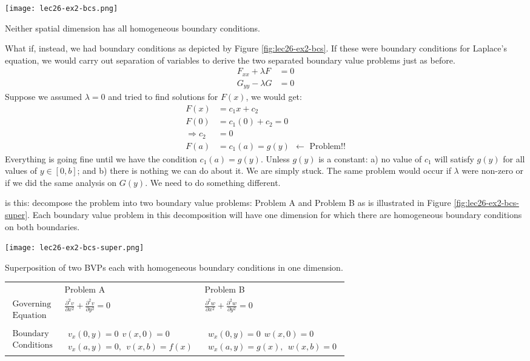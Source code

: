 \begin{marginfigure}
\texttt{[image: lec26-ex2-bcs.png]}
\caption{Neither spatial dimension has all homogeneous boundary conditions.}
\label{fig:lec26-ex2-bcs}
\end{marginfigure}
What if, instead, we had boundary conditions as depicted by Figure \ref{fig:lec26-ex2-bcs}.  If these were boundary conditions for Laplace's equation, we would carry out separation of variables to derive the two separated boundary value problems just as before.
\begin{align*}
F_{xx}+\lambda F &= 0 \\
G_{yy}-\lambda G &= 0
\end{align*}
Suppose we assumed $\lambda = 0$ and tried to find solutions for $F(x)$, we would get:
\begin{align*}
F(x) &= c_1 x + c_2 \\
F(0) &= c_1 (0) +  c_2 = 0 \\
\Rightarrow c_2 &= 0 \\
F(a) &= c_1(a) = g(y) \ \ \leftarrow \text{  Problem!!}
\end{align*}
Everything is going fine until we have the condition $c_1(a) = g(y)$.  Unless $g(y)$ is a constant: a) no value of $c_1$ will satisfy $g(y)$ for all values of $y \in [0,b]$; and b) there is nothing we can do about it.  We are simply stuck.  The same problem would occur if $\lambda$ were non-zero or if we did the same analysis on $G(y)$.  We need to do something different.


 is this: decompose the problem into two boundary value problems: Problem A and Problem B as is illustrated in Figure \ref{fig:lec26-ex2-bcs-super}.  Each boundary value problem in this decomposition will have one dimension for which there are homogeneous boundary conditions on both boundaries.
\begin{marginfigure}
\texttt{[image: lec26-ex2-bcs-super.png]}
\caption{Superposition of two BVPs each with homogeneous boundary conditions in one dimension.}
\label{fig:lec26-ex2-bcs-super}
\end{marginfigure}
\begin{table}
\begin{tabular}{l l | l}
 & Problem A & Problem B \\ 
 $\substack{\text{Governing} \\ \text{Equation}}$ & $\frac{\partial^2 v}{\partial x^2} + \frac{\partial^2 v}{\partial y^2}=0$ & $\frac{\partial^2 w}{\partial x^2} + \frac{\partial^2 w}{\partial y^2}=0$\\
 & & \\
 $\substack{\text{Boundary}\\\text{Conditions}}$ & $\substack{v_x(0,y) = 0 \ \ v(x,0) = 0\\ v_x(a,y) = 0, \ \ v(x,b)=f(x)}$ & $\substack{w_x(0,y) = 0 \ \ w(x,0) = 0 \\ w_x(a,y) = g(x), \ \ w(x,b) = 0}$
\end{tabular}
\end{table}

